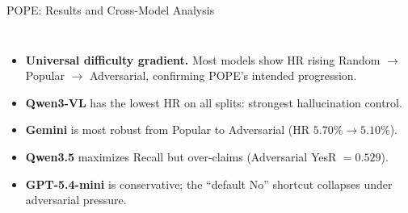 \documentclass[9pt,aspectratio=169]{beamer}
\begin{document}
\begin{frame}{POPE: Results and Cross-Model Analysis}
\begin{columns}[c,onlytextwidth]
      \vspace{0.1em}
      \begin{itemize}\setlength{\itemsep}{0.1em}
        \item \textbf{Universal difficulty gradient.}
              Most models show HR rising
              Random $\to$ Popular $\to$ Adversarial,
              confirming POPE's intended progression.
        \item \textbf{Qwen3-VL} has the lowest HR on all splits:
              strongest hallucination control.
        \item \textbf{Gemini} is most robust from Popular to Adversarial
              (HR $5.70\%\to5.10\%$).
        \item \textbf{Qwen3.5} maximizes Recall but over-claims
              (Adversarial YesR $=0.529$).
        \item \textbf{GPT-5.4-mini} is conservative;
              the ``default No'' shortcut collapses under adversarial pressure.
      \end{itemize}
  \end{columns}
\end{frame}
\end{document}
